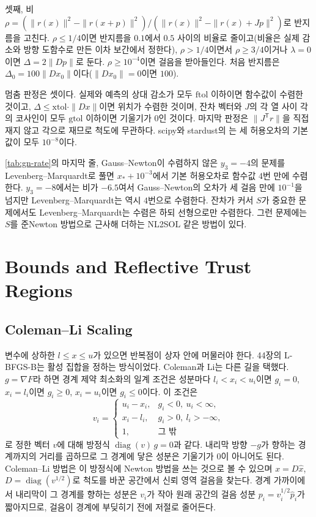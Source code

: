 셋째, 비 $\rho=(\|r(x)\|^2-\|r(x+p)\|^2)/(\|r(x)\|^2-\|r(x)+Jp\|^2)$로 반지름을 고친다. $\rho\le1/4$이면 반지름을 $0.1$에서 $0.5$ 사이의 비율로 줄이고(비율은 실제 감소와 방향 도함수로 만든 이차 보간에서 정한다), $\rho>1/4$이면서 $\rho\ge3/4$이거나 $\lambda=0$이면 $\Delta=2\|Dp\|$로 둔다. $\rho\ge10^{-4}$이면 걸음을 받아들인다. 처음 반지름은 $\Delta_0=100\|Dx_0\|$이다($\|Dx_0\|=0$이면 $100$).

멈춤 판정은 셋이다. 실제와 예측의 상대 감소가 모두 $\mathrm{ftol}$ 이하이면 함수값이 수렴한 것이고, $\Delta\le\mathrm{xtol}\cdot\|Dx\|$이면 위치가 수렴한 것이며, 잔차 벡터와 $J$의 각 열 사이 각의 코사인이 모두 $\mathrm{gtol}$ 이하이면 기울기가 $0$인 것이다. 마지막 판정은 $\|J^{\mathsf T}r\|$을 직접 재지 않고 각으로 재므로 척도에 무관하다. scipy와 stardust의 는 세 허용오차의 기본값이 모두 $10^{-8}$이다.

\cref{tab:gn-rate}의 마지막 줄, Gauss--Newton이 수렴하지 않은 $y_3=-4$의 문제를 Levenberg--Marquardt로 풀면 $x_\ast+10^{-3}$에서 기본 허용오차로 함수값 $4$번 만에 수렴한다. $y_3=-8$에서는 비가 $-6.5$여서 Gauss--Newton의 오차가 세 걸음 만에 $10^{-1}$을 넘지만 Levenberg--Marquardt는 역시 $4$번으로 수렴한다. 잔차가 커서 $S$가 중요한 문제에서도 Levenberg--Marquardt는 수렴은 하되 선형으로만 수렴한다. 그런 문제에는 $S$를 준Newton 방법으로 근사해 더하는 NL2SOL 같은 방법이 있다\cite{dennis1981nl2sol}.

\section{Bounds and Reflective Trust Regions}
\label{sec:trf}

\subsection{Coleman--Li Scaling}

변수에 상하한 $l\le x\le u$가 있으면 반복점이 상자 안에 머물러야 한다. 44장의 L-BFGS-B는 활성 집합을 정하는 방식이었다. Coleman과 Li는 다른 길을 택했다\cite{coleman1996}. $g=\nabla F$라 하면 경계 제약 최소화의 일계 조건은 성분마다 $l_i<x_i<u_i$이면 $g_i=0$, $x_i=l_i$이면 $g_i\ge0$, $x_i=u_i$이면 $g_i\le0$이다. 이 조건은
\[
v_i=\begin{cases}u_i-x_i,&g_i<0,\ u_i<\infty,\\x_i-l_i,&g_i>0,\ l_i>-\infty,\\1,&\text{그 밖}\end{cases}
\]
로 정한 벡터 $v$에 대해 방정식 $\operatorname{diag}(v)\,g=0$과 같다. 내리막 방향 $-g$가 향하는 경계까지의 거리를 곱하므로 그 경계에 닿은 성분은 기울기가 $0$이 아니어도 된다. Coleman--Li 방법은 이 방정식에 Newton 방법을 쓰는 것으로 볼 수 있으며 $x=D\hat x$, $D=\operatorname{diag}(v^{1/2})$로 척도를 바꾼 공간에서 신뢰 영역 걸음을 찾는다. 경계 가까이에서 내리막이 그 경계를 향하는 성분은 $v_i$가 작아 원래 공간의 걸음 성분 $p_i=v_i^{1/2}\hat p_i$가 짧아지므로, 걸음이 경계에 부딪히기 전에 저절로 줄어든다.

